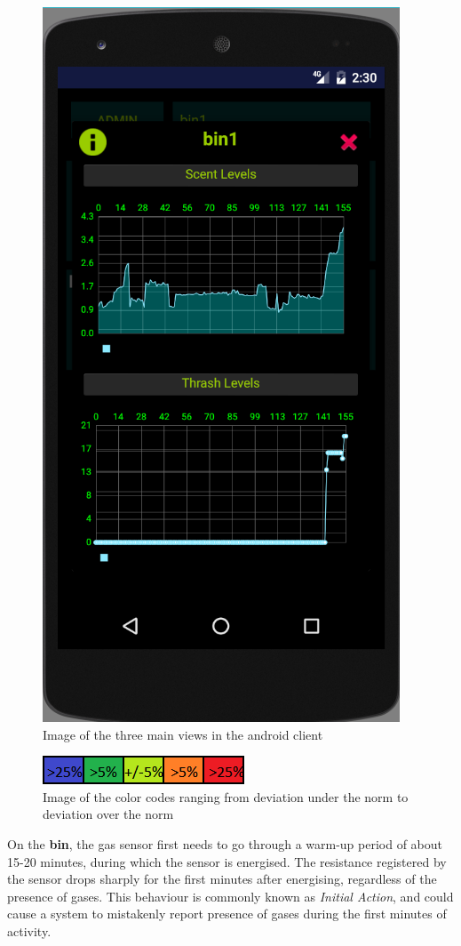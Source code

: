 \begin{figure}
\includegraphics[scale=.3]{img/screen_stats}
\caption{Image of the three main views in the android client} 	
\label{fig:clientmodes}
\end{figure}

\begin{figure}
\centering
\includegraphics{img/app_colors_nb}
\caption{Image of the color codes ranging from deviation under the norm to deviation over the norm} 
\label{fig:colorcodes}
\end{figure}

On the \textbf{bin}, the gas sensor first needs to go through a warm-up period of about 15-20 minutes, during which the sensor is energised. The resistance registered by the sensor drops sharply for the first minutes after energising, regardless of the presence of gases. This behaviour is commonly known as \textit{Initial Action}, and could cause a system to mistakenly report presence of gases during the first minutes of activity\cite{tgs2602}.

